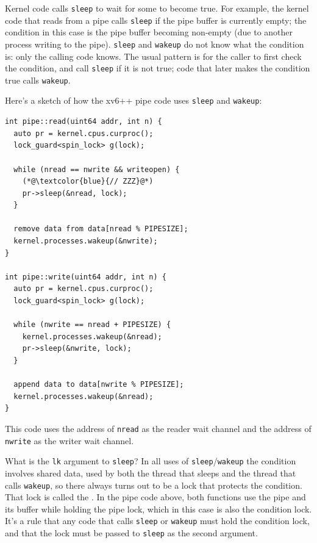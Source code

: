 Kernel code calls \lstinline{sleep} to wait for some
 to become true. For example, the kernel code
that reads from a pipe calls \lstinline{sleep} if the pipe buffer is
currently empty; the condition in this case is the pipe buffer
becoming non-empty (due to another process writing to the pipe).
\lstinline{sleep} and \lstinline{wakeup} do not know what the
condition is: only the calling code knows. The usual pattern is for
the caller to first check the condition, and call \lstinline{sleep}
if it is not true; code that later makes the
condition true calls \lstinline{wakeup}.

Here's a sketch of how the xv6++ pipe code uses
\lstinline{sleep} and \lstinline{wakeup}:

\begin{lstlisting}
int pipe::read(uint64 addr, int n) {
  auto pr = kernel.cpus.curproc();
  lock_guard<spin_lock> g(lock);

  while (nread == nwrite && writeopen) {
    (*@\textcolor{blue}{// ZZZ}@*)
    pr->sleep(&nread, lock);
  }

  remove data from data[nread % PIPESIZE];
  kernel.processes.wakeup(&nwrite);
}

int pipe::write(uint64 addr, int n) {
  auto pr = kernel.cpus.curproc();
  lock_guard<spin_lock> g(lock);

  while (nwrite == nread + PIPESIZE) {
    kernel.processes.wakeup(&nread);
    pr->sleep(&nwrite, lock);
  }

  append data to data[nwrite % PIPESIZE];
  kernel.processes.wakeup(&nread);
}
\end{lstlisting}

This code uses the address of
\lstinline{nread}
as the reader wait channel and the address of
\lstinline{nwrite}
as the writer wait channel.

What is the \lstinline{lk} argument to \lstinline{sleep}?
In all uses of \lstinline{sleep}/\lstinline{wakeup}
the condition involves shared data, used by both the
thread that sleeps and the thread that calls \lstinline{wakeup}, so
there always turns out to be a lock that protects the condition. That lock is
called the . In the pipe code above, both
functions use the pipe and its buffer while holding the pipe lock,
which in this case is also the condition lock. It's a rule that any code
that calls \lstinline{sleep} or \lstinline{wakeup} must hold the
condition lock, and that the lock must be passed to \lstinline{sleep}
as the second argument.

